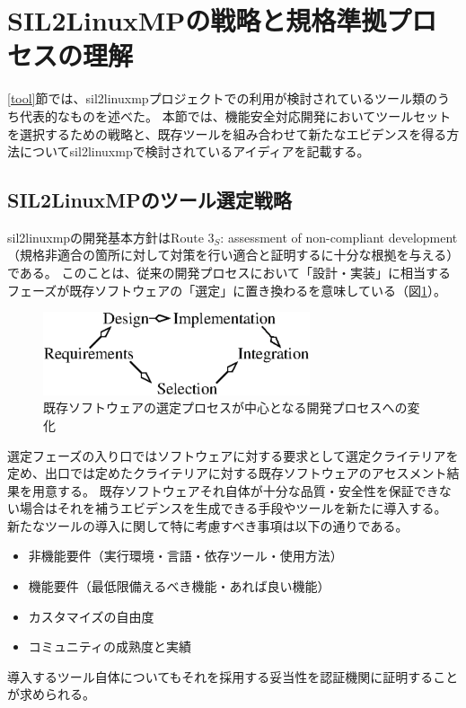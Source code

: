 \section{SIL2LinuxMPの戦略と規格準拠プロセスの理解}
\label{sil2process}
\ref{tool}節では、\acrshort{sil2linuxmp}プロジェクトでの利用が検討されているツール類のうち代表的なものを述べた。
本節では、機能安全対応開発においてツールセットを選択するための戦略と、既存ツールを組み合わせて新たなエビデンスを得る方法について\acrshort{sil2linuxmp}で検討されているアイディアを記載する。
\subsection{SIL2LinuxMPのツール選定戦略}
\label{toolselection}
\acrshort{sil2linuxmp}の開発基本方針はRoute \textbf{$3_S$}: assessment of non-compliant development（規格非適合の箇所に対して対策を行い適合と証明するに十分な根拠を与える）である。
このことは、従来の開発プロセスにおいて「設計・実装」に相当するフェーズが既存ソフトウェアの「選定」に置き換わるを意味している（図\ref{dlc}）。
\begin{figure}[ht]
  \centering
  \includegraphics[width=0.7\textwidth]{pic/DLC.eps}
  \caption{既存ソフトウェアの選定プロセスが中心となる開発プロセスへの変化}
  \label{dlc}
\end{figure}
\par
選定フェーズの入り口ではソフトウェアに対する要求として選定クライテリアを定め、出口では定めたクライテリアに対する既存ソフトウェアのアセスメント結果を用意する。
既存ソフトウェアそれ自体が十分な品質・安全性を保証できない場合はそれを補うエビデンスを生成できる手段やツールを新たに導入する。
新たなツールの導入に関して特に考慮すべき事項は以下の通りである。
\begin{itemize}
  \item 非機能要件（実行環境・言語・依存ツール・使用方法）
  \item 機能要件（最低限備えるべき機能・あれば良い機能）
  \item カスタマイズの自由度
  \item コミュニティの成熟度と実績
\end{itemize}
\par
導入するツール自体についてもそれを採用する妥当性を認証機関に証明することが求められる。
